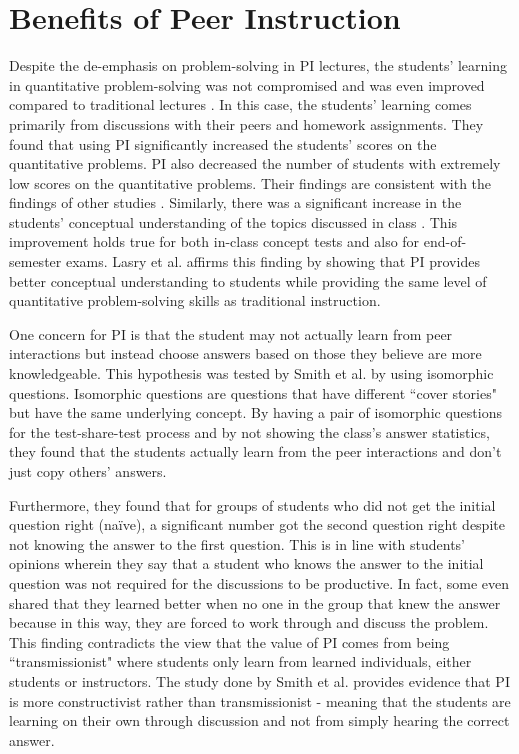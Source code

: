 \section{Benefits of Peer Instruction}
Despite the de-emphasis on problem-solving in PI lectures, the students' learning in quantitative problem-solving was not compromised and was even improved compared to traditional lectures \cite{crouch2001peer}.
In this case, the students' learning comes primarily from discussions with their peers and homework assignments.
They found that using PI significantly increased the students' scores on the quantitative problems.
PI also decreased the number of students with extremely low scores on the quantitative problems.
Their findings are consistent with the findings of other studies \cite{thacker1994comparing,lasry2008peer}.
Similarly, there was a significant increase in the students' conceptual understanding of the topics discussed in class \cite{crouch2001peer}.
This improvement holds true for both in-class concept tests and also for end-of-semester exams.
Lasry et al. \cite{lasry2008peer} affirms this finding by showing that PI provides better conceptual understanding to students while providing the same level of quantitative problem-solving skills as traditional instruction.

One concern for PI is that the student may not actually learn from peer interactions but instead choose answers based on those they believe are more knowledgeable.
This hypothesis was tested by Smith et al. \cite{smith2009peer} by using isomorphic questions.
Isomorphic questions are questions that have different ``cover stories" but have the same underlying concept.
By having a pair of isomorphic questions for the test-share-test process and by not showing the class's answer statistics, they found that the students actually learn from the peer interactions and don't just copy others' answers.

Furthermore, they found that for groups of students who did not get the initial question right (naïve), a significant number got the second question right despite not knowing the answer to the first question.
This is in line with students' opinions wherein they say that a student who knows the answer to the initial question was not required for the discussions to be productive.
In fact, some even shared that they learned better when no one in the group that knew the answer because in this way, they are forced to work through and discuss the problem.
This finding contradicts the view that the value of PI comes from being ``transmissionist" where students only learn from learned individuals, either students or instructors.
The study done by Smith et al. \cite{smith2009peer} provides evidence that PI is more constructivist rather than transmissionist - meaning that the students are learning on their own through discussion and not from simply hearing the correct answer.

